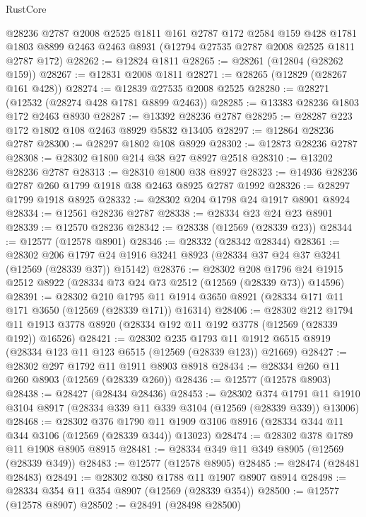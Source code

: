 \begin{lexlean}{RustCore}
\begin{coremodule}
    @28236
    @2787
    @2008
    @2525
    @1811
    @161
    @2787
    @172
    @2584
    @159
    @428
    @1781
    @1803
    @8899
    @2463
    @2463
    @8931
    (@12794 @27535 @2787 @2008 @2525 @1811 @2787 @172)
@28262 := @12824 @1811
@28265 := @28261 (@12804 (@28262 @159))
@28267 := @12831 @2008 @1811
@28271 := @28265 (@12829 (@28267 @161 @428))
@28274 := @12839 @27535 @2008 @2525
@28280 := @28271 (@12532 (@28274 @428 @1781 @8899 @2463))
@28285 := @13383 @28236 @1803 @172 @2463 @8930
@28287 := @13392 @28236 @2787
@28295 := @28287 @223 @172 @1802 @108 @2463 @8929 @5832 @13405
@28297 := @12864 @28236 @2787
@28300 := @28297 @1802 @108 @8929
@28302 := @12873 @28236 @2787
@28308 := @28302 @1800 @214 @38 @27 @8927 @2518
@28310 := @13202 @28236 @2787
@28313 := @28310 @1800 @38 @8927
@28323 := @14936 @28236 @2787 @260 @1799 @1918 @38 @2463 @8925 @2787 @1992
@28326 := @28297 @1799 @1918 @8925
@28332 := @28302 @204 @1798 @24 @1917 @8901 @8924
@28334 := @12561 @28236 @2787
@28338 := @28334 @23 @24 @23 @8901
@28339 := @12570 @28236
@28342 := @28338 (@12569 (@28339 @23))
@28344 := @12577 (@12578 @8901)
@28346 := @28332 (@28342 @28344)
@28361 := @28302
    @206
    @1797
    @24
    @1916
    @3241
    @8923
    (@28334 @37 @24 @37 @3241 (@12569 (@28339 @37)) @15142)
@28376 := @28302
    @208
    @1796
    @24
    @1915
    @2512
    @8922
    (@28334 @73 @24 @73 @2512 (@12569 (@28339 @73)) @14596)
@28391 := @28302
    @210
    @1795
    @11
    @1914
    @3650
    @8921
    (@28334 @171 @11 @171 @3650 (@12569 (@28339 @171)) @16314)
@28406 := @28302
    @212
    @1794
    @11
    @1913
    @3778
    @8920
    (@28334 @192 @11 @192 @3778 (@12569 (@28339 @192)) @16526)
@28421 := @28302
    @235
    @1793
    @11
    @1912
    @6515
    @8919
    (@28334 @123 @11 @123 @6515 (@12569 (@28339 @123)) @21669)
@28427 := @28302 @297 @1792 @11 @1911 @8903 @8918
@28434 := @28334 @260 @11 @260 @8903 (@12569 (@28339 @260))
@28436 := @12577 (@12578 @8903)
@28438 := @28427 (@28434 @28436)
@28453 := @28302
    @374
    @1791
    @11
    @1910
    @3104
    @8917
    (@28334 @339 @11 @339 @3104 (@12569 (@28339 @339)) @13006)
@28468 := @28302
    @376
    @1790
    @11
    @1909
    @3106
    @8916
    (@28334 @344 @11 @344 @3106 (@12569 (@28339 @344)) @13023)
@28474 := @28302 @378 @1789 @11 @1908 @8905 @8915
@28481 := @28334 @349 @11 @349 @8905 (@12569 (@28339 @349))
@28483 := @12577 (@12578 @8905)
@28485 := @28474 (@28481 @28483)
@28491 := @28302 @380 @1788 @11 @1907 @8907 @8914
@28498 := @28334 @354 @11 @354 @8907 (@12569 (@28339 @354))
@28500 := @12577 (@12578 @8907)
@28502 := @28491 (@28498 @28500)

\end{coremodule}
\end{lexlean}

